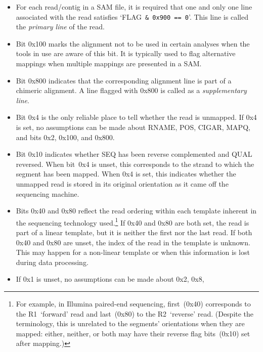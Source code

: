 \begin{enumerate}
\begin{center}
\begin{tabular}{rrl}
      \end{tabular}
      \end{center}
      \begin{itemize}
      \item For each read/contig in a SAM file, it is required that one and only
        one line associated with the read satisfies \mbox{`{\sf FLAG} {\tt \& 0x900
        == 0}'}. This line is called the \emph{primary line} of the read.
      \item Bit 0x100 marks the alignment not to be used in certain analyses
        when the tools in use are aware of this bit. It is typically used to
        flag alternative mappings when multiple mappings are presented in a SAM.
      \item Bit 0x800 indicates that the corresponding alignment line is part of
        a chimeric alignment. A line flagged with 0x800 is called as a \emph{supplementary line}.
      \item Bit 0x4 is the only reliable place to tell whether the read
        is unmapped. If 0x4 is set, no assumptions can be made about {\sf
          RNAME}, {\sf POS}, {\sf CIGAR}, {\sf MAPQ}, and bits 0x2, 0x100,
        and 0x800.
      \item Bit 0x10 indicates whether {\sf SEQ} has been reverse complemented
        and {\sf QUAL} reversed.
        When bit~0x4 is unset, this corresponds to the strand to which the
        segment has been mapped.
        When 0x4 is set, this indicates whether the unmapped read is stored
        in its original orientation as it came off the sequencing machine.
      \item Bits 0x40 and 0x80 reflect the read ordering within each template
        inherent in the sequencing technology used.\footnote{For example,
        in Illumina paired-end sequencing, {\sf first}~(0x40) corresponds to
        the R1~`forward' read and {\sf last}~(0x80) to the R2~`reverse' read.
        (Despite the terminology, this is unrelated to the segments' orientations
        when they are mapped: either, neither, or both may have their
        {\sf reverse} flag bits~(0x10) set after mapping.)}
        If 0x40 and 0x80 are both set, the read is part of a linear
        template, but it is neither the first nor the last read. If both
        0x40 and 0x80 are unset, the index of the read in the template
        is unknown. This may happen for a non-linear template or when this
        information is lost during data processing.
      \item If 0x1 is unset, no assumptions can be made about 0x2, 0x8,

\end{itemize}
\end{enumerate}

